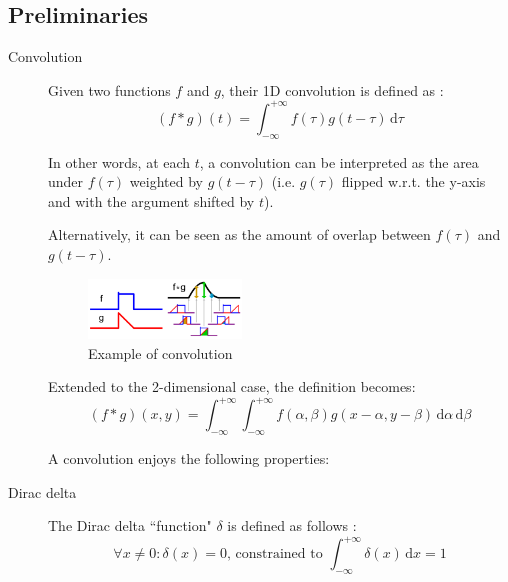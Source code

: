 \subsection{Preliminaries}

\begin{description}
    \item[Convolution] 
        Given two functions $f$ and $g$, their 1D convolution is defined as \cite{wiki:1d_convolution}:
        \[ (f * g)(t) = \int_{-\infty}^{+\infty} f(\tau)g(t - \tau) \,\text{d}\tau  \]

        In other words, at each $t$, a convolution can be interpreted as the area under $f(\tau)$ 
        weighted by $g(t - \tau)$ (i.e. $g(\tau)$ flipped w.r.t. the y-axis and with the argument shifted by $t$).

        Alternatively, it can be seen as the amount of overlap between $f(\tau)$ and $g(t - \tau)$.

        \begin{figure}[H]
            \centering
            \includegraphics[width=0.4\textwidth]{./img/continuous_convolution_example.png}
            \caption{Example of convolution}
        \end{figure}

        Extended to the 2-dimensional case, the definition becomes:
        \[ (f * g)(x, y) = \int_{-\infty}^{+\infty} \int_{-\infty}^{+\infty} f(\alpha, \beta)g(x-\alpha, y-\beta) \,\text{d}\alpha\,\text{d}\beta  \]
        
        A convolution enjoys the following properties: 

    \item[Dirac delta] 
        The Dirac delta ``function" $\delta$ is defined as follows \cite{wiki:dirac,book:sonka}:
        \[ \forall x \neq 0: \delta(x) = 0 \text{, constrained to } \int_{-\infty}^{+\infty} \delta(x) \,\text{d}x = 1 \]


\end{description}
